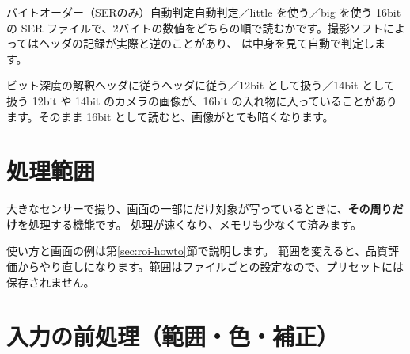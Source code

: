 \begin{setting}{ バイトオーダー（SERのみ）}{自動判定}{自動判定／little を使う／big を使う}
  16bit の SER ファイルで、2バイトの数値をどちらの順で読むかです。撮影ソフトによってはヘッダの記録が実際と逆のことがあり、
  \LS は中身を見て自動で判定します。
\end{setting}

\begin{setting}{ ビット深度の解釈}{ヘッダに従う}{ヘッダに従う／12bit として扱う／14bit として扱う}
  12bit や 14bit のカメラの画像が、16bit の入れ物に入っていることがあります。そのまま 16bit として読むと、画像がとても暗くなります。
\end{setting}

\section{処理範囲}\label{sec:roi}

大きなセンサーで撮り、画面の一部にだけ対象が写っているときに、\textbf{その周りだけ}を処理する機能です。
処理が速くなり、メモリも少なくて済みます。


使い方と画面の例は第\ref{sec:roi-howto}節で説明します。
範囲を変えると、品質評価からやり直しになります。範囲はファイルごとの設定なので、プリセットには保存されません。

\section{入力の前処理（範囲・色・補正）}


